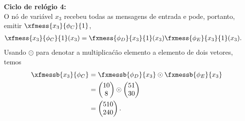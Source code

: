 \begin{exenumerate}
\begin{solution}
        { \bf Ciclo de rel\'ogio 4:}\\
        O n\'o de vari\'avel $x_3$ recebeu todas as mensagens de entrada e pode, portanto, emitir $\xfmess{x_3}{\phi_C}{1}$,
        \begin{align}
            \xfmess{x_3}{\phi_C}{1}(x_3) & = \fxmess{\phi_D}{x_3}{1}(x_3)\fxmess{\phi_E}{x_3}{1}(x_3).
        \end{align}
        Usando $\odot$ para denotar a multiplica\'c\~ao elemento a elemento de dois vetores, temos 
        \begin{align}
            \xfmessb{x_3}{\phi_C} & = \fxmessb{\phi_D}{x_3} \odot \fxmessb{\phi_E}{x_3}\\
            & = \begin{pmatrix}
                10 \\
                8
            \end{pmatrix}
            \odot
            \begin{pmatrix}
                51 \\
                30 \\
            \end{pmatrix}\\
            & = \begin{pmatrix}
                510 \\
                240
            \end{pmatrix}.
        \end{align}
        

\end{solution}
\end{exenumerate}
